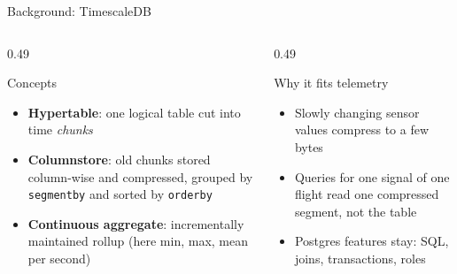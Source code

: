 \documentclass[aspectratio=169,10pt]{beamer}
\newcommand{\code}[1]{\texttt{\footnotesize #1}}
\begin{document}
\begin{frame}[shrink=5]{Background: TimescaleDB}
\begin{columns}[T]
\begin{column}{0.49\textwidth}
\begin{block}{Concepts}
\begin{itemize}
  \item \textbf{Hypertable}: one logical table cut into time \emph{chunks}
  \item \textbf{Columnstore}: old chunks stored column-wise and compressed, grouped by \code{segmentby} and sorted by \code{orderby}
  \item \textbf{Continuous aggregate}: incrementally maintained rollup (here min, max, mean per second)
\end{itemize}
\end{block}
\end{column}
\begin{column}{0.49\textwidth}
\begin{block}{Why it fits telemetry}
\begin{itemize}
  \item Slowly changing sensor values compress to a few bytes
  \item Queries for one signal of one flight read one compressed segment, not the table
  \item Postgres features stay: SQL, joins, transactions, roles
\end{itemize}
\end{block}
\end{column}
\end{columns}
\end{frame}
\end{document}
